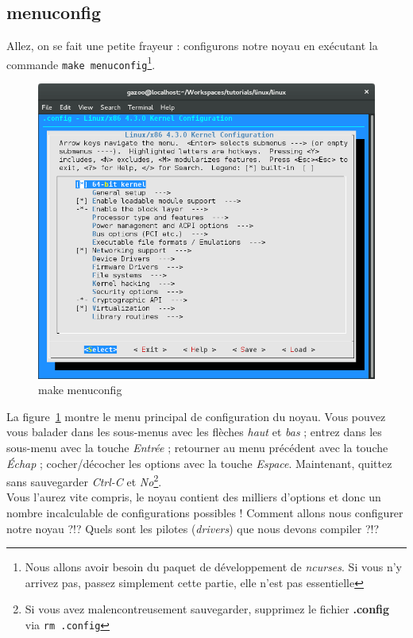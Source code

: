\documentclass[a4paper]{article}
\begin{document}
\subsection{menuconfig}

Allez, on se fait une petite frayeur : configurons notre noyau en exécutant la commande \lstinline{make menuconfig}\footnote{Nous allons avoir besoin du paquet de développement de \textit{ncurses}. Si vous n'y arrivez pas, passez simplement cette partie, elle n'est pas essentielle}.\\

\begin{figure}
\label{fig:make_menuconfig}
\includegraphics[scale=0.5]{../res/make-menuconfig.png}
\caption{make menuconfig}
\end{figure}

La figure~\ref{fig:make_menuconfig} montre le menu principal de configuration du noyau. Vous pouvez vous balader dans les sous-menus avec les flèches \textit{haut} et \textit{bas} ; entrez dans les sous-menu avec la touche \textit{Entrée} ; retourner au menu précédent avec la touche \textit{Échap} ; cocher/décocher les options avec la touche \textit{Espace}. Maintenant, quittez sans sauvegarder \textit{Ctrl-C} et \textit{No}\footnote{Si vous avez malencontreusement sauvegarder, supprimez le fichier \textbf{.config} via \lstset{language=sh}\lstinline{rm .config}}.\\

Vous l'aurez vite compris, le noyau contient des milliers d'options et donc un nombre incalculable de configurations possibles ! Comment allons nous configurer notre noyau ?!? Quels sont les pilotes (\textit{drivers}) que nous devons compiler ?!?

\clearpage
\listoffigures
\end{document}
